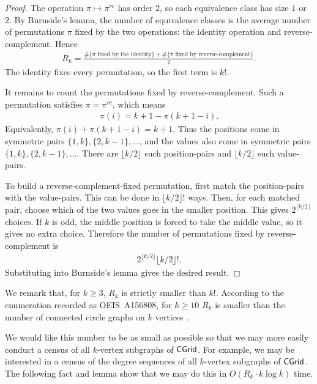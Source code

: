 \begin{proof}
The operation \(\pi\mapsto \pi^{rc}\) has order \(2\), so each equivalence
class has size \(1\) or \(2\). By Burnside's lemma, the number of equivalence
classes is the average number of permutations $\pi$ fixed by the two operations:
the identity operation and reverse-complement. Hence
\begin{align}
    R_k
    =
    \frac{
        \#\{\text{$\pi$ fixed by the identity}\}
        +
        \#\{\text{$\pi$ fixed by reverse-complement}\}
    }{2}.
\end{align}
The identity fixes every permutation, so the first term is \(k!\).

It remains to count the permutations fixed by reverse-complement. Such a
permutation satisfies \(\pi=\pi^{rc}\), which means
\begin{align}
    \pi(i)
    =
    k+1-\pi(k+1-i).
\end{align}
Equivalently,
$
    \pi(i)+\pi(k+1-i)
    =
    k+1.
$
Thus the positions come in symmetric pairs
\(\{1,k\},\{2,k-1\},\dots\), and the values also come in symmetric pairs
\(\{1,k\},\{2,k-1\},\dots\). There are \(\lfloor k/2\rfloor\) such
position-pairs and \(\lfloor k/2\rfloor\) such value-pairs.

To build a reverse-complement-fixed permutation, first match the
position-pairs with the value-pairs. This can be done in
\(\lfloor k/2\rfloor!\) ways. Then, for each matched pair, choose which of
the two values goes in the smaller position. This gives
\(2^{\lfloor k/2\rfloor}\) choices. If \(k\) is odd, the middle position is
forced to take the middle value, so it gives no extra choice. Therefore the
number of permutations fixed by reverse-complement is
\begin{align}
    2^{\lfloor k/2\rfloor}\lfloor k/2\rfloor!.
\end{align}
Substituting into Burnside's lemma gives the desired result.
\end{proof}

We remark that, for $k\geq 3$, $R_k$ is strictly smaller than $k!$. According to the enumeration recorded as OEIS~A156808, for \(k\ge 10\) \(R_k\) is smaller than the number of connected circle graphs on
\(k\) vertices \cite{OEIS_A156808}.

We would like this number to be as small as possible so that we may more easily conduct a census of all $k$-vertex subgraphs of $\mathsf{CGrid}$. For example, we may be interested in a census of the degree sequences of all $k$-vertex subgraphs of $\mathsf{CGrid}$. The following fact and lemma show that we may do this in $O(R_k \cdot k \log k)$ time.

